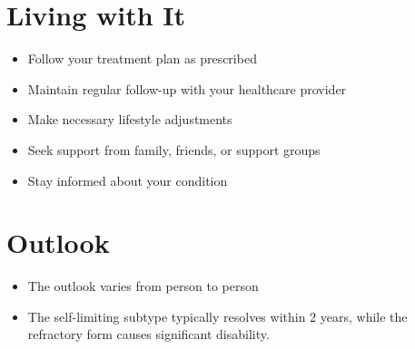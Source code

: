 \section{Living with It}
\begin{itemize}[noitemsep]
  \item Follow your treatment plan as prescribed
  \item Maintain regular follow-up with your healthcare provider
  \item Make necessary lifestyle adjustments
  \item Seek support from family, friends, or support groups
  \item Stay informed about your condition
\end{itemize}
\section{Outlook}
\begin{itemize}[noitemsep]
  \item The outlook varies from person to person
  \item The self-limiting subtype typically resolves within 2 years, while the refractory form causes significant disability.
\end{itemize}

